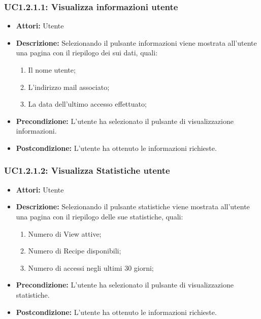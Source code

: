 \subsubsection{UC1.2.1.1: Visualizza informazioni utente}

\begin{itemize}
    \item \textbf{Attori:} Utente
    \item \textbf{Descrizione:} Selezionando il pulsante informazioni viene mostrata all'utente una pagina con il riepilogo dei sui dati, quali:
    \begin{enumerate}
        \item Il nome utente;
        \item L'indirizzo mail associato;
        \item La data dell'ultimo accesso effettuato;
    \end{enumerate}
    \item \textbf{Precondizione:} L'utente ha selezionato il pulsante di visualizzazione informazioni.
    \item \textbf{Postcondizione:} L'utente ha ottenuto le informazioni richieste.
\end{itemize}

\subsubsection{UC1.2.1.2: Visualizza Statistiche utente}

\begin{itemize}
    \item \textbf{Attori:} Utente
    \item \textbf{Descrizione:} Selezionando il pulsante statistiche viene mostrata all'utente una pagina con il riepilogo delle sue statistiche, quali:
    \begin{enumerate}
        \item Numero di View attive;
        \item Numero di Recipe disponibili;
        \item Numero di accessi negli ultimi 30 giorni;
    \end{enumerate}
    \item \textbf{Precondizione:} L'utente ha selezionato il pulsante di visualizzazione statistiche.
    \item \textbf{Postcondizione:} L'utente ha ottenuto le informazioni richieste.
\end{itemize}

